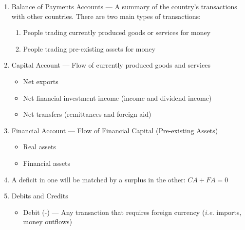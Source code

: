 \documentclass[12pt]{article}
\begin{document}
\begin{enumerate}
  \item Balance of Payments Accounts — A summary of the country's transactions with other countries. There are two main types of transactions:

    \begin{enumerate}

      \item People trading currently produced goods or services for money

      \item People trading pre-existing assets for money

    \end{enumerate}

  \item Capital Account — Flow of currently produced goods and services

    \begin{itemize}

      \item Net exports

      \item Net financial investment income (income and dividend income)

      \item Net transfers (remittances and foreign aid)

    \end{itemize}

  \item Financial Account — Flow of Financial Capital (Pre-existing Assets)

    \begin{itemize}

      \item Real assets

      \item Financial assets

    \end{itemize}

  \item A deficit in one will be matched by a surplus in the other: $CA + FA = 0$

  \item Debits and Credits

    \begin{itemize}

      \item Debit (-) — Any transaction that requires foreign currency (\textit{i.e.} imports, money outflows)


\end{itemize}
\end{enumerate}
\end{document}
